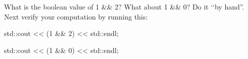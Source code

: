 What is the boolean value of 1 \&\& 2? What about 1 \&\& 0? Do it \lq\lq by hand''. Next verify your computation by running this:\\

\begin{console}

std::cout << (1 \&\& 2) << std::endl;

std::cout << (1 \&\& 0) << std::endl; 

\end{console}

